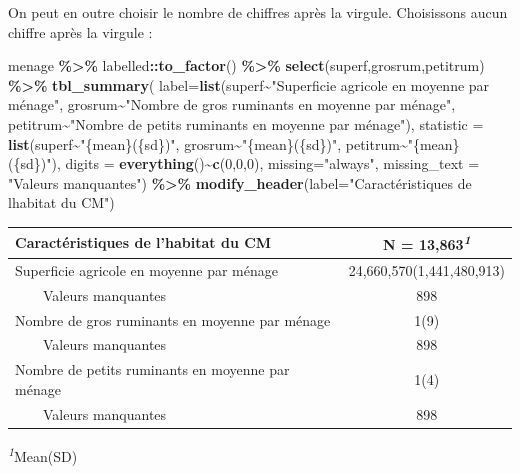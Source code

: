 \documentclass[
]{article}
\newenvironment{Shaded}{\begin{snugshade}}{\end{snugshade}}
\newcommand{\AttributeTok}[1]{\textcolor[rgb]{0.13,0.29,0.53}{#1}}
\newcommand{\DecValTok}[1]{\textcolor[rgb]{0.00,0.00,0.81}{#1}}
\newcommand{\FunctionTok}[1]{\textcolor[rgb]{0.13,0.29,0.53}{\textbf{#1}}}
\newcommand{\NormalTok}[1]{#1}
\newcommand{\SpecialCharTok}[1]{\textcolor[rgb]{0.81,0.36,0.00}{\textbf{#1}}}
\newcommand{\StringTok}[1]{\textcolor[rgb]{0.31,0.60,0.02}{#1}}
\begin{document}
On peut en outre choisir le nombre de chiffres après la virgule.
Choisissons aucun chiffre après la virgule :

\begin{Shaded}
\begin{Highlighting}[]
\NormalTok{menage }\SpecialCharTok{\%\textgreater{}\%}
\NormalTok{  labelled}\SpecialCharTok{::}\FunctionTok{to\_factor}\NormalTok{() }\SpecialCharTok{\%\textgreater{}\%}
  \FunctionTok{select}\NormalTok{(superf,grosrum,petitrum) }\SpecialCharTok{\%\textgreater{}\%}
  \FunctionTok{tbl\_summary}\NormalTok{(}
    \AttributeTok{label=}\FunctionTok{list}\NormalTok{(superf}\SpecialCharTok{\textasciitilde{}}\StringTok{"Superficie agricole en moyenne par ménage"}\NormalTok{,}
\NormalTok{               grosrum}\SpecialCharTok{\textasciitilde{}}\StringTok{"Nombre de gros ruminants en moyenne par ménage"}\NormalTok{,}
\NormalTok{               petitrum}\SpecialCharTok{\textasciitilde{}}\StringTok{"Nombre de petits ruminants en moyenne par ménage"}\NormalTok{),}
    \AttributeTok{statistic =} \FunctionTok{list}\NormalTok{(superf}\SpecialCharTok{\textasciitilde{}}\StringTok{"\{mean\}(\{sd\})"}\NormalTok{,}
\NormalTok{                     grosrum}\SpecialCharTok{\textasciitilde{}}\StringTok{"\{mean\}(\{sd\})"}\NormalTok{,}
\NormalTok{                     petitrum}\SpecialCharTok{\textasciitilde{}}\StringTok{"\{mean\}(\{sd\})"}\NormalTok{),}
    \AttributeTok{digits =} \FunctionTok{everything}\NormalTok{()}\SpecialCharTok{\textasciitilde{}}\FunctionTok{c}\NormalTok{(}\DecValTok{0}\NormalTok{,}\DecValTok{0}\NormalTok{,}\DecValTok{0}\NormalTok{),}
    \AttributeTok{missing=}\StringTok{"always"}\NormalTok{,}
    \AttributeTok{missing\_text =} \StringTok{"Valeurs manquantes"}\NormalTok{) }\SpecialCharTok{\%\textgreater{}\%}
  \FunctionTok{modify\_header}\NormalTok{(}\AttributeTok{label=}\StringTok{"Caractéristiques de l\textquotesingle{}habitat du CM"}\NormalTok{)}
\end{Highlighting}
\end{Shaded}

\begin{table}[!t]
\fontsize{12.0pt}{14.4pt}\selectfont
\begin{tabular*}{\linewidth}{@{\extracolsep{\fill}}lc}
\toprule
Caractéristiques de l'habitat du CM & \textbf{N = 13,863}\textsuperscript{\textit{1}} \\ 
\midrule\addlinespace[2.5pt]
Superficie agricole en moyenne par ménage & 24,660,570(1,441,480,913) \\ 
    Valeurs manquantes & 898 \\ 
Nombre de gros ruminants en moyenne par ménage & 1(9) \\ 
    Valeurs manquantes & 898 \\ 
Nombre de petits ruminants en moyenne par ménage & 1(4) \\ 
    Valeurs manquantes & 898 \\ 
\bottomrule
\end{tabular*}
\begin{minipage}{\linewidth}
\textsuperscript{\textit{1}}Mean(SD)\\
\end{minipage}
\end{table}
\end{document}
